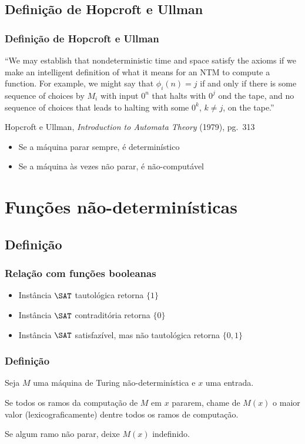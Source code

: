 \documentclass[utf8,notheorems]{beamer}
\theoremstyle{definition}
\begin{document}
\subsection{Definição de Hopcroft e Ullman}
\begin{frame}
    \frametitle{Definição de Hopcroft e Ullman}
    ``We may establish that nondeterministic time and space
    satisfy the axioms if we make an intelligent definition of what it means
    for an NTM to compute a function.
    For example, we might say that $\phi_i(n) = j$
    if and only if there is some sequence of choices by $M_i$ with input $0^n$
    that halts with $0^j$ ond the tape,
    and no sequence of choices that leads to halting with some $0^k$, $k \neq j$,
    on the tape.''

    {\scriptsize
        Hopcroft e Ullman, \emph{Introduction to Automata Theory} (1979), pg.~313
    }

    \pause
    \begin{itemize}
        \item Se a máquina parar sempre, é determinístico
        \item Se a máquina às vezes não parar, é não-computável
    \end{itemize}
\end{frame}

\section{Funções não-determinísticas}

\subsection{Definição}
\begin{frame}
    \frametitle{Relação com funções booleanas}
    \begin{itemize}
        \item Instância $\SAT$ tautológica retorna $\{1\}$
        \item Instância $\SAT$ contraditória retorna $\{0\}$
        \item Instância $\SAT$ satisfazível, mas não tautológica retorna $\{0, 1\}$
    \end{itemize}
\end{frame}
\begin{frame}
    \frametitle{Definição}
    Seja $M$ uma máquina de Turing não-determinística
    e $x$ uma entrada.

    Se todos os ramos da computação de $M$ em $x$ pararem,
    chame de $M(x)$ o maior valor
    (lexicograficamente)
    dentre todos os ramos de computação.

    Se algum ramo não parar,
    deixe $M(x)$ indefinido.
\end{frame}
\end{document}
